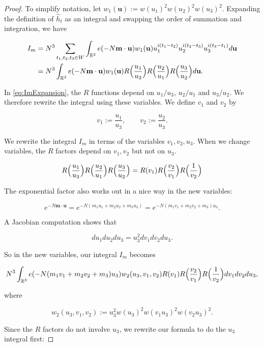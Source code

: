 \documentclass{amsart}
\theoremstyle{plain}
\numberwithin{equation}{section}
\begin{document}
\begin{proof} 
To simplify notation, let $w_1(\mathbf{u}):=w(u_1)^2w(u_2)^2w(u_3)^2$. Expanding the definition of $\widehat{h}_t$ as an integral and swapping the order of summation and integration,  we have

\begin{align}
I_m&=N^3 \sum_{t_1,t_2,t_3\in W}\int_{\mathbb{R}^3}e(-N \mathbf{m}\cdot \mathbf{u})w_1(\mathbf{u})u_1^{i(t_1-t_2)}u_2^{i(t_2-t_3)}u_3^{i(t_3-t_1)}d\mathbf{u}\nonumber\\
&= N^3\int_{\mathbb{R}^3}e(-N \mathbf{m}\cdot \mathbf{u})w_1(\mathbf{u}) R\Bigl(\frac{u_1}{u_3}\Bigr)R\Bigl(\frac{u_2}{u_1}\Bigr)R\Bigl(\frac{u_3}{u_2}\Bigr)d\mathbf{u}.\label{eq:ImExpansion}
\end{align}

In \eqref{eq:ImExpansion},  the $R$ functions depend on $u_1/u_3$, $u_2/u_1$ and $u_3/u_2$.   We therefore rewrite the integral using these variables.  
We define $v_1$ and $v_2$ by

$$ v_1 := \frac{u_1}{u_3}, \qquad v_2 := \frac{u_2}{u_3}. $$

We rewrite the integral $I_m$ in terms of the variables $v_1, v_2, u_3$.  
When we change variables,  the $R$ factors depend on $v_1, v_2$ but not on $u_3$.  

\[ R\Bigl(\frac{u_1}{u_3}\Bigr)R\Bigl(\frac{u_2}{u_1}\Bigr)R\Bigl(\frac{u_3}{u_2}\Bigr) = R ( v_1 ) R \Big( \frac{v_2}{v_1} \Big) R \Big( \frac{1}{v_2} \Big) \]

The exponential factor also works out in a nice way in the new variables:

$$ e^{-N \mathbf{m} \cdot \mathbf{u}} = e^{-N(m_1 u_1 + m_2 u_2 + m_3 u_3)} = e^{-N (m_1 v_1 + m_2 v_2 + m_3) u_3}. $$

A Jacobian computation  shows that

$$ du_1 du_2 du_3 = u_3^2 dv_1 dv_2 du_3. $$

So in the new variables, our integral $I_m$ becomes

\[
 N^3 \int_{\mathbb{R}^3} e(-N (m_1 v_1+ m_2 v_2+m_3)u_3)w_{2}(u_3,v_1,v_2)R(v_1)R\Bigl(\frac{v_2}{v_1}\Bigr)R\Bigl(\frac{1}{v_2}\Bigr) dv_1 dv_2 du_3,
 \]
 
where 

\begin{equation}
w_2(u_3,v_1,v_2):=u_3^2w(u_3)^2w(v_1u_3)^2w(v_2u_3)^2.
\label{eq:w2Def}
\end{equation}

Since the $R$ factors do not involve $u_3$, we rewrite our formula to do the $u_3$ integral first:


\end{proof}
\end{document}
